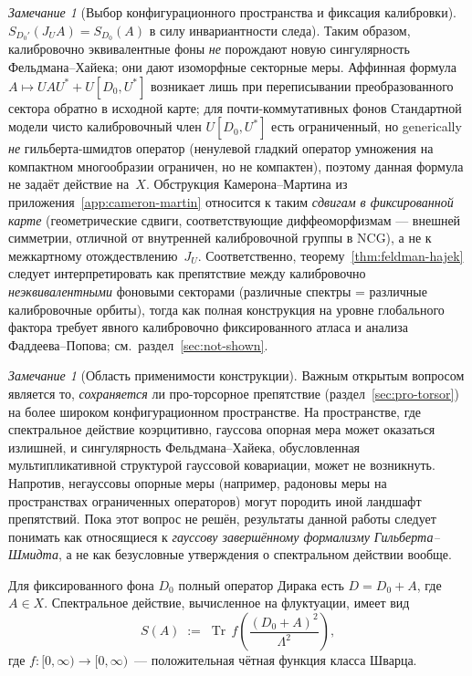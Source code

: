 \documentclass[12pt,a4paper]{article}
\theoremstyle{plain}
\theoremstyle{definition}
\theoremstyle{remark}
\newtheorem{remark}[theorem]{Замечание}
\newcommand{\Tr}{\operatorname{Tr}}
\newcommand{\Lam}{\Lambda}
\begin{document}
\begin{remark}[Выбор конфигурационного пространства и фиксация калибровки]
$S_{D_0'}(J_U A) = S_{D_0}(A)$ в силу инвариантности следа).
Таким образом, калибровочно эквивалентные фоны \emph{не} порождают
новую сингулярность Фельдмана--Хайека; они дают изоморфные
секторные меры.
Аффинная формула $A \mapsto UAU^* + U[D_0,U^*]$ возникает лишь
при переписывании преобразованного сектора обратно в исходной карте;
для почти-коммутативных фонов Стандартной модели чисто калибровочный
член $U[D_0,U^*]$ есть ограниченный, но generically
\emph{не} гильберта-шмидтов оператор (ненулевой гладкий оператор
умножения на компактном многообразии ограничен, но не компактен),
поэтому данная формула не задаёт действие на~$X$.
Обструкция Камерона--Мартина из приложения~\ref{app:cameron-martin}
относится к таким \emph{сдвигам в фиксированной карте}
(геометрические сдвиги, соответствующие диффеоморфизмам --- внешней
симметрии, отличной от внутренней калибровочной группы в NCG), а не
к межкартному отождествлению~$J_U$.
Соответственно, теорему~\ref{thm:feldman-hajek} следует
интерпретировать как препятствие между калибровочно
\emph{неэквивалентными} фоновыми секторами (различные спектры
= различные калибровочные орбиты), тогда как полная
конструкция на уровне глобального фактора требует явного
калибровочно фиксированного атласа и анализа Фаддеева--Попова;
см.\ раздел~\ref{sec:not-shown}.
\end{remark}

\begin{remark}[Область применимости конструкции]
Важным открытым вопросом является то, \emph{сохраняется} ли
про-торсорное препятствие
(раздел~\ref{sec:pro-torsor}) на более широком конфигурационном
пространстве.  На пространстве, где спектральное действие
коэрцитивно, гауссова опорная мера может оказаться излишней, и
сингулярность Фельдмана--Хайека, обусловленная мультипликативной
структурой гауссовой ковариации, может не возникнуть.
Напротив, негауссовы опорные меры (например, радоновы меры на
пространствах ограниченных операторов) могут породить иной ландшафт
препятствий.  Пока этот вопрос не решён, результаты данной работы
следует понимать как относящиеся к \emph{гауссову завершённому
формализму Гильберта--Шмидта}, а не как безусловные утверждения о
спектральном действии вообще.
\end{remark}

Для фиксированного фона $D_0$ полный оператор Дирака есть
$D = D_0 + A$, где $A \in X$.  Спектральное действие, вычисленное
на флуктуации, имеет вид
\begin{equation}\label{eq:SA-fluctuation}
  S(A) \;:=\; \Tr\, f\!\left(\frac{(D_0+A)^2}{\Lam^2}\right),
\end{equation}
где $f\colon [0,\infty) \to [0,\infty)$~--- положительная чётная
функция класса Шварца.
\end{document}
